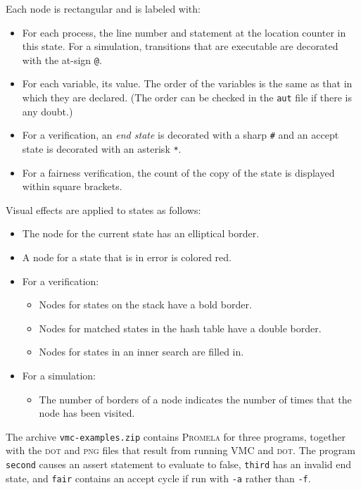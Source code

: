 \documentclass[11pt]{article}
\newcommand*{\vmc}{\textsc{VMC}}
\newcommand*{\prm}{\textsc{Promela}}
\newcommand*{\dt}{\textsc{dot}}
\newcommand*{\p}[1]{\texttt{#1}}
\begin{document}
Each node is rectangular and is labeled with:
\begin{itemize}
\item For each process, the line number and statement at the
location counter in this state. For a simulation, transitions that are
executable are decorated with the at-sign \verb+@+.
\item For each variable, its value. The order of the variables is the
same as that in which they are declared. (The order can be checked in
the \p{aut} file if there is any doubt.)
\item For a verification, an \emph{end state} is decorated with a sharp
\verb+#+ and an accept state is decorated with an asterisk \verb+*+.
\item For a fairness verification, the count of the copy of the state
is displayed within square brackets.
\end{itemize}

Visual effects are applied to states as follows:
\begin{itemize}
\item The node for the current state has an elliptical border.
\item A node for a state that is in error is colored red.
\item For a verification:
\begin{itemize}
\item Nodes for states on the stack have a bold border.
\item Nodes for matched states in the hash table have a double border.
\item Nodes for states in an inner search are filled in.
\end{itemize}
\item For a simulation:
\begin{itemize}
\item The number of borders of a node indicates the number of times
that the node has been visited.
\end{itemize}
\end{itemize}

The archive \p{vmc-examples.zip} contains \prm{} for three programs,
together with the \dt{} and \textsc{png} files that result from running
\vmc{} and \dt{}. The program \p{second} causes an assert statement to
evaluate to false, \p{third} has an invalid end state, and \p{fair}
contains an accept cycle if run with \p{-a} rather than \p{-f}.

\newpage
\end{document}
